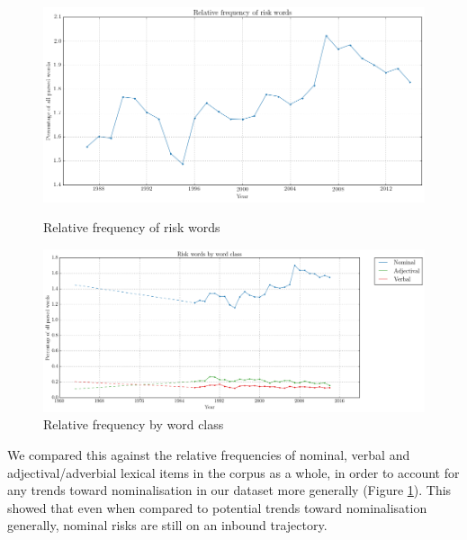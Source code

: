 
    \noindent
    \begin{figure}[htb!]
    \centering
    \begin{minipage}{.45\textwidth}
    \centering
    \includegraphics[width=.95\textwidth]{../images/relative_frequency_of_risk_words.png}
    \caption{Relative frequency of risk words}
    \label{fig:relative_frequency_of_risk_words}
    \end{minipage}%
    \begin{minipage}{.55\textwidth}
    \centering
    \includegraphics[width=.95\textwidth]{../images/risk_words_by_word_class.png}
    \caption{Relative frequency by word class}
    \label{fig:wordclasses}
    \end{minipage}
    \end{figure}



    We compared this against the relative frequencies of nominal, verbal and adjectival\slash adverbial lexical items in the corpus as a whole, in order to account for any trends toward nominalisation in our dataset more generally (Figure \ref{fig:wordclasses}). This showed that even when compared to potential trends toward nominalisation generally, nominal risks are still on an inbound trajectory.

